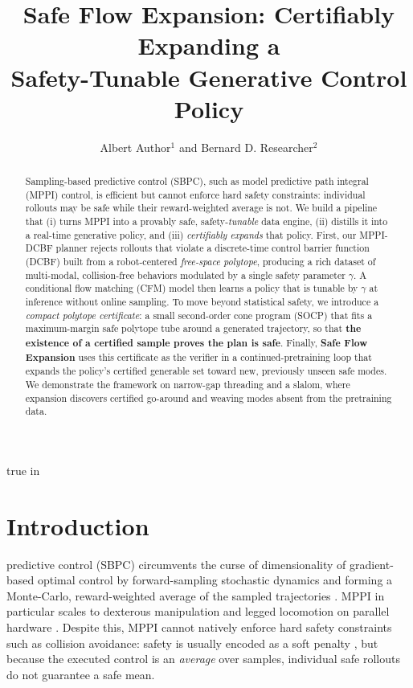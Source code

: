 \documentclass[letterpaper, 10 pt, conference]{ieeeconf}
\title{\LARGE \bf
Safe Flow Expansion: Certifiably Expanding a \\ Safety-Tunable Generative Control Policy
}
\author{Albert Author$^{1}$ and Bernard D. Researcher$^{2}$}
\newcommand{\keyword}[1]{\textbf{#1}}
\begin{document}
\maketitle
\thispagestyle{empty}
\pagestyle{empty}
 true in
\begin{abstract}
Sampling-based predictive control (SBPC), such as model predictive path integral (MPPI) control, is efficient but cannot enforce hard safety constraints: individual rollouts may be safe while their reward-weighted average is not. We build a pipeline that (i) turns MPPI into a provably safe, safety-\emph{tunable} data engine, (ii) distills it into a real-time generative policy, and (iii) \emph{certifiably expands} that policy. First, our MPPI-DCBF planner rejects rollouts that violate a discrete-time control barrier function (DCBF) built from a robot-centered \emph{free-space polytope}, producing a rich dataset of multi-modal, collision-free behaviors modulated by a single safety parameter $\gamma$. A conditional flow matching (CFM) model then learns a policy that is tunable by $\gamma$ at inference without online sampling. To move beyond statistical safety, we introduce a \emph{compact polytope certificate}: a small second-order cone program (SOCP) that fits a maximum-margin safe polytope tube around a generated trajectory, so that \keyword{the existence of a certified sample proves the plan is safe}. Finally, \keyword{Safe Flow Expansion} uses this certificate as the verifier in a continued-pretraining loop that expands the policy's certified generable set toward new, previously unseen safe modes. We demonstrate the framework on narrow-gap threading and a slalom, where expansion discovers certified go-around and weaving modes absent from the pretraining data.
\end{abstract}
\section{Introduction}
 predictive control (SBPC) circumvents the curse of dimensionality of gradient-based optimal control by forward-sampling stochastic dynamics and forming a Monte-Carlo, reward-weighted average of the sampled trajectories \cite{williams2017model, howell2022predictive}. MPPI \cite{williams2016aggressive} in particular scales to dexterous manipulation and legged locomotion on parallel hardware \cite{li2025drop, xue2025full, kurtz2024hydrax}. Despite this, MPPI cannot natively enforce hard safety constraints such as collision avoidance: safety is usually encoded as a soft penalty \cite{williams2017model, mohamed2023gp}, but because the executed control is an \emph{average} over samples, individual safe rollouts do not guarantee a safe mean.
\end{document}
